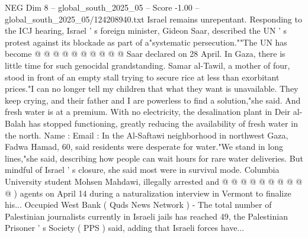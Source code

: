 \begin{textsample}{NEG Dim 8 – global\_south\_2025\_05 – Score -1.00 – global\_south\_2025\_05/124208940.txt}
Israel remains unrepentant.
Responding to the ICJ hearing, Israel ' s foreign minister, Gideon Saar, described the UN ' s protest against its blockade as part of a"systematic persecution.""The UN has become @ @ @ @ @ @ @ @ @ @ Saar declared on 28 April.
In Gaza, there is little time for such genocidal grandstanding.
Samar al-Tawil, a mother of four, stood in front of an empty stall trying to secure rice at less than exorbitant prices."I can no longer tell my children that what they want is unavailable.
They keep crying, and their father and I are powerless to find a solution,"she said.
And fresh water is at a premium.
With no electricity, the desalination plant in Deir al-Balah has stopped functioning, greatly reducing the availability of fresh water in the north.
Name : Email : In the Al-Saftawi neighborhood in northwest Gaza, Fadwa Hamad, 60, said residents were desperate for water."We stand in long lines,"she said, describing how people can wait hours for rare water deliveries.
But mindful of Israel ' s closure, she said most were in survival mode.
Columbia University student Mohsen Mahdawi, illegally arrested and @ @ @ @ @ @ @ @ @ @ ) agents on April 14 during a naturalization interview in Vermont to finalize his...
Occupied West Bank ( Quds News Network ) - The total number of Palestinian journalists currently in Israeli jails has reached 49, the Palestinian Prisoner ' s Society ( PPS ) said, adding that Israeli forces have...

\end{textsample}
